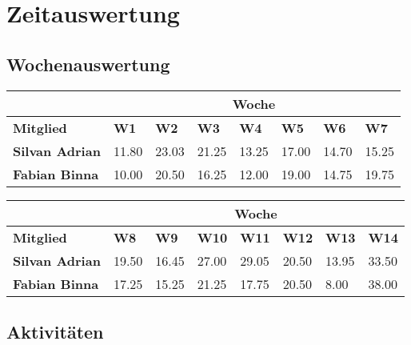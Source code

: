 \chapter{Zeitauswertung}

\section{Wochenauswertung}

\begin{table}[h]
\begin{tabularx}{\linewidth}{l X X X X X X X}
& \multicolumn{7}{c}{\textbf{Woche}}\\
\hline
\textbf{Mitglied} & \textbf{W1} & \textbf{W2} & \textbf{W3} & \textbf{W4} & \textbf{W5} & \textbf{W6} & \textbf{W7} \\
\hline
\textbf{Silvan Adrian} & 11.80  & 23.03  & 21.25 & 13.25 & 17.00 & 14.70 & 15.25  \\
\hline
\textbf{Fabian Binna} & 10.00 & 20.50 & 16.25 & 12.00 & 19.00 & 14.75 & 19.75 \\
\end{tabularx}
\end{table}
\begin{table}[h]
\begin{tabularx}{\linewidth}{l X X X X X X X}
 & \multicolumn{7}{c}{\textbf{Woche}}\\
\hline
\textbf{Mitglied} & \textbf{W8} & \textbf{W9} & \textbf{W10} & \textbf{W11} & \textbf{W12} &
 \textbf{W13} & \textbf{W14}\\
\hline
\textbf{Silvan Adrian} & 19.50 & 16.45 & 27.00 & 29.05  & 20.50  & 13.95 & 33.50 \\
\hline
\textbf{Fabian Binna} & 17.25 & 15.25 & 21.25 & 17.75 & 20.50 & 8.00 & 38.00 \\
\end{tabularx}
\end{table}

\section{Aktivitäten}

\newcommand{\Specification}{26.25}
\newcommand{\Development}{109.95} 
\newcommand{\Testing}{27.00} 
\newcommand{\Allgemein}{149.10} 
\newcommand{\Dokumentation}{166.18} 
\newcommand{\Analyse}{55.75} 


